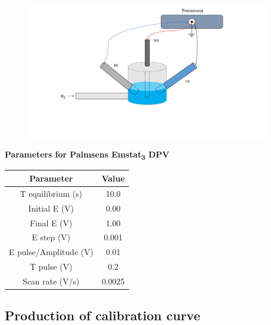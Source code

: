 \begin{appendices}
\begin{figure}[H]
\centering
\includegraphics[height=6cm]{img/james1.png}
 \end{figure}
\textbf{Parameters for Palmsens Emstat\textsubscript{3} DPV}

\begin{table}[H]
    \centering
    \begin{tabular}{|c|c|}
    \hline
    \textbf{Parameter} & \textbf{Value}  \\ 
    \hline
    T equilibrium (s) & 10.0 \\
    Initial E (V) & 0.00 \\
    Final E (V)& 1.00 \\
    E step (V) & 0.001 \\
    E pulse/Amplitude (V) & 0.01 \\
    T pulse (V) & 0.2 \\
    Scan rate (V/s) & 0.0025 \\
    \hline
    \end{tabular}
 
    \label{tab:my_label}
\end{table}

\subsection{Production of calibration curve}


\end{appendices}
